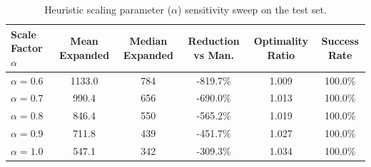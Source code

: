 \begin{table}[H]
\centering
\small
\begin{tabular}{lccccc}
\toprule
\textbf{Scale Factor $\alpha$} & \textbf{Mean Expanded} & \textbf{Median Expanded} & \textbf{Reduction vs Man.} & \textbf{Optimality Ratio} & \textbf{Success Rate} \\
\midrule
$\alpha = 0.6$ & 1133.0 & 784 & -819.7\% & 1.009 & 100.0\% \\
$\alpha = 0.7$ & 990.4 & 656 & -690.0\% & 1.013 & 100.0\% \\
$\alpha = 0.8$ & 846.4 & 550 & -565.2\% & 1.019 & 100.0\% \\
$\alpha = 0.9$ & 711.8 & 439 & -451.7\% & 1.027 & 100.0\% \\
$\alpha = 1.0$ & 547.1 & 342 & -309.3\% & 1.034 & 100.0\% \\
\bottomrule
\end{tabular}
\caption{Heuristic scaling parameter ($\alpha$) sensitivity sweep on the test set.}
\label{tab:alpha_sweep}
\end{table}

